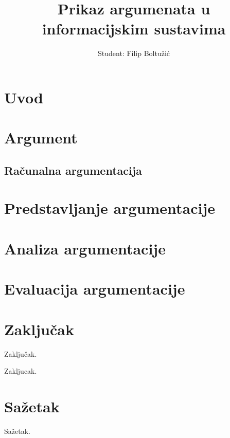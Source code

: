 \documentclass[times, utf8, seminar]{fer}
\begin{document}
\title{Prikaz argumenata u informacijskim sustavima}
% 
\author{Student: Filip Boltužić}
% 

\maketitle
 
\tableofcontents
 
\chapter{Uvod} 

 
\chapter{Argument} 

 
\section{Računalna argumentacija} 
\label{chap:rac_arg}


\chapter{Predstavljanje argumentacije}
\label{chap:aif}


\chapter{Analiza argumentacije}


\chapter{Evaluacija argumentacije}


\chapter{Zaključak} Zaključak.

Zakljucak. 

 

\chapter{Sažetak} Sažetak.
\end{document}
